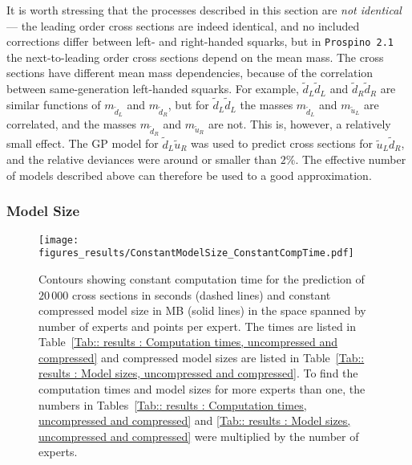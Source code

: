 \documentclass[twoside,english]{uiofysmaster}
\begin{document}
{{It is worth stressing that the processes described in this section are \textit{not identical} --- the leading order cross sections are indeed identical, and no included corrections differ between left- and right-handed squarks, but in \verb|Prospino 2.1| the next-to-leading order cross sections depend on the mean mass. The cross sections have different mean mass dependencies, because of the correlation between same-generation left-handed squarks. For example, $\widetilde{d}_L \widetilde{d}_L$ and $\widetilde{d}_R \widetilde{d}_R$ are similar functions of $m_{\widetilde{d}_L}$ and $m_{\widetilde{d}_R}$, but for $\widetilde{d}_L \widetilde{d}_L$ the masses $m_{\widetilde{d}_L}$ and $m_{\widetilde{u}_L}$ are correlated, and the masses $m_{\widetilde{d}_R}$ and $m_{\widetilde{u}_R}$ are not. This is, however, a relatively small effect. The GP model for $\widetilde{d}_L \widetilde{u}_R$ was used to predict cross sections for $\widetilde{u}_L \widetilde{d}_R$, and the relative deviances were around or smaller than $2\%$. The effective number of models described above can therefore be used to a good approximation.
 

\subsubsection{Model Size}

\begin{figure}
\centering
\texttt{[image: figures\_results/ConstantModelSize\_ConstantCompTime.pdf]}
\caption{Contours showing constant computation time for the prediction of $20\,000$ cross sections in seconds (dashed lines) and constant compressed model size in MB (solid lines) in the space spanned by number of experts and points per expert. The times are listed in Table~\ref{Tab:: results : Computation times, uncompressed and compressed} and compressed model sizes are listed in Table~\ref{Tab:: results : Model sizes, uncompressed and compressed}. To find the computation times and model sizes for more experts than one, the numbers in Tables~\ref{Tab:: results : Computation times, uncompressed and compressed} and \ref{Tab:: results : Model sizes, uncompressed and compressed} were multiplied by the number of experts.}
\label{Fig:: results : Contours of constant time and storage size}
\end{figure}

}}
\end{document}
